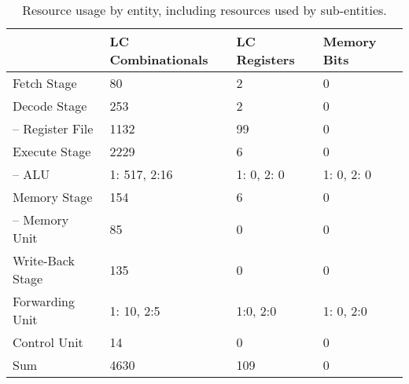 \begin{table}[htb]
  \centering
  \caption{Resource usage by entity, including resources used by sub-entities.}
  \begin{tabular}{llll}
    \toprule
                         & LC Combinationals & LC Registers & Memory Bits \\
    \midrule
    Fetch Stage          & 80                & 2            & 0           \\
    Decode Stage         & 253               & 2            & 0           \\
    -- Register File     & 1132              & 99           & 0           \\
    Execute Stage        & 2229              & 6            & 0           \\
    -- ALU               & 1: 517, 2:16      & 1: 0, 2: 0   & 1: 0, 2: 0  \\
    Memory Stage         & 154               & 6            & 0           \\
    -- Memory Unit       & 85  	             & 0            & 0           \\
    Write-Back Stage     & 135               & 0            & 0           \\
    Forwarding Unit      & 1: 10, 2:5        & 1:0, 2:0     & 1: 0, 2:0   \\
    Control Unit         & 14                & 0            & 0           \\
    \cmidrule{1-4}
    Sum                  & 4630              & 109          & 0           \\
    \bottomrule
  \end{tabular}
\end{table}

\begin{qa}
\end{qa}

